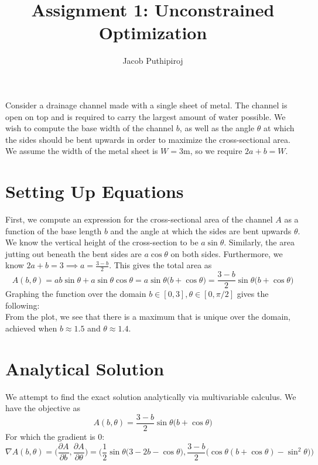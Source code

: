 \documentclass{article}
\begin{document}
\title{Assignment 1: Unconstrained Optimization}
\author{Jacob Puthipiroj}
\maketitle

Consider a drainage channel made with a single sheet of metal. The channel is open on top and is required to carry the largest amount of water possible. We wish to compute the base width of the channel $b$, as well as the angle $\theta$ at which the sides should be bent upwards in order to maximize the cross-sectional area.  We assume the width of the metal sheet is $W = 3$m, so we require $2a+b=W$.

\section*{Setting Up Equations}
First, we compute an expression for the cross-sectional area of the channel $A$ as a function of the base length $b$ and the angle at which the sides are bent upwards $\theta$. \\

We know the vertical height of the cross-section to be $a \sin \theta$. Similarly, the area jutting out beneath the bent sides are $a \cos\theta$ on both sides. Furthermore, we know $2a+b=3 \implies a = \frac{3 - b}{2}$. 
This gives the total area as 
$$ A(b,\theta) = ab \sin\theta + a \sin\theta  \cos\theta  = a \sin\theta \big(b+\cos \theta \big) = \frac{3-b}{2} \sin\theta \big(b + \cos\theta \big)$$
Graphing the function over the domain $b \in [0, 3], \theta \in [0, \pi/2]$ gives the following:\\



From the plot, we see that there is a maximum that is unique over the domain, achieved when $b \approx 1.5$ and $\theta \approx 1.4$.

\section*{Analytical Solution}
We attempt to find the exact solution analytically via multivariable calculus. We have the objective  as
$$A(b,\theta) = \frac{3-b}{2} \sin\theta \big(b + \cos\theta \big)$$
For which the gradient is 0:
$$ \nabla A(b,\theta) = \bigg(\frac{\partial A}{\partial b}, \frac{\partial A}{\partial \theta} \bigg) = \bigg(\frac{1}{2} \sin \theta \big(3 - 2b - \cos \theta),  \frac{3-b}{2} \big (\cos \theta (b + \cos \theta ) - \sin^2 \theta \big)  \bigg)$$
\end{document}
